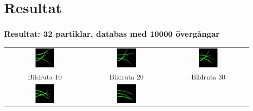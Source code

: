 \documentclass[]{beamer}
\renewcommand{\oe}{\"{o}}
\begin{document}
\section{Resultat}
\begin{frame}
  \frametitle{Resultat: 32 partiklar, databas med 10000 \oe verg\aa ngar}
  
  \begin{center}
    \begin{tabular}{ccc}
      \includegraphics[width=0.25\textwidth]{tracking/frame10.png}
      & \includegraphics[width=0.25\textwidth]{tracking/frame20.png}
      & \includegraphics[width=0.25\textwidth]{tracking/frame30.png}
      \\
      Bildruta 10 & Bildruta 20 & Bildruta 30\\
      \includegraphics[width=0.25\textwidth]{tracking/frame40.png}
      & \includegraphics[width=0.25\textwidth]{tracking/frame50.png}

\end{tabular}
\end{center}
\end{frame}
\end{document}

